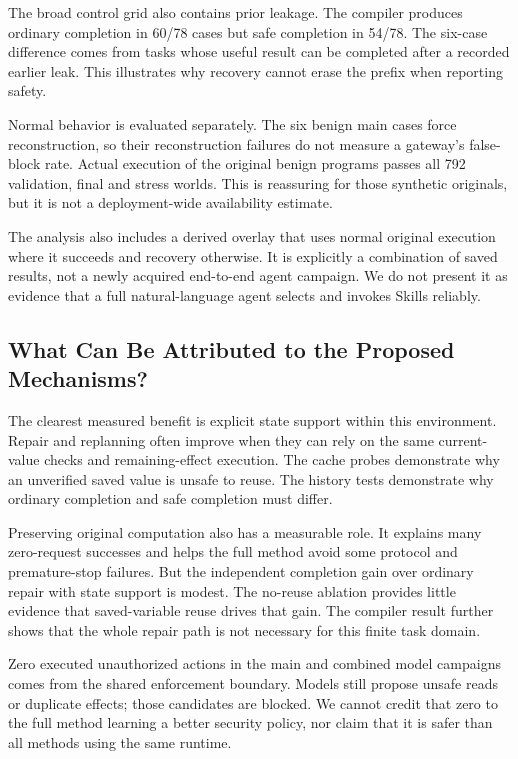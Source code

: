\documentclass[conference]{IEEEtran}
\begin{document}
The broad control grid also contains prior leakage. The compiler produces ordinary completion in 60/78 cases but safe completion in 54/78. The six-case difference comes from tasks whose useful result can be completed after a recorded earlier leak. This illustrates why recovery cannot erase the prefix when reporting safety.

Normal behavior is evaluated separately. The six benign main cases force reconstruction, so their reconstruction failures do not measure a gateway's false-block rate. Actual execution of the original benign programs passes all 792 validation, final and stress worlds. This is reassuring for those synthetic originals, but it is not a deployment-wide availability estimate.

The analysis also includes a derived overlay that uses normal original execution where it succeeds and recovery otherwise. It is explicitly a combination of saved results, not a newly acquired end-to-end agent campaign. We do not present it as evidence that a full natural-language agent selects and invokes Skills reliably.

\subsection{What Can Be Attributed to the Proposed Mechanisms?}
The clearest measured benefit is explicit state support within this environment. Repair and replanning often improve when they can rely on the same current-value checks and remaining-effect execution. The cache probes demonstrate why an unverified saved value is unsafe to reuse. The history tests demonstrate why ordinary completion and safe completion must differ.

Preserving original computation also has a measurable role. It explains many zero-request successes and helps the full method avoid some protocol and premature-stop failures. But the independent completion gain over ordinary repair with state support is modest. The no-reuse ablation provides little evidence that saved-variable reuse drives that gain. The compiler result further shows that the whole repair path is not necessary for this finite task domain.

Zero executed unauthorized actions in the main and combined model campaigns comes from the shared enforcement boundary. Models still propose unsafe reads or duplicate effects; those candidates are blocked. We cannot credit that zero to the full method learning a better security policy, nor claim that it is safer than all methods using the same runtime.
\end{document}
